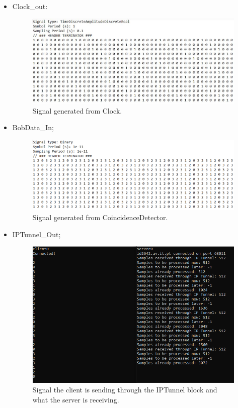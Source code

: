 \begin{refsection}
\begin{itemize}
	
	\item Clock\_out:
	\begin{figure}[H]
		\centering
		\includegraphics[width=1.1\linewidth]{./sdf/arduino_quantum_rx/figures/Clock.JPG}
		\caption{Signal generated from Clock.}
		\label{fig:arduino}
	\end{figure}
	\clearpage
	
	\item BobData\_In;
	\begin{figure}[H]
		\centering
		\includegraphics[width=1.1\linewidth]{./sdf/arduino_quantum_rx/figures/Bobdatain.PNG}
		\caption{Signal generated from CoincidenceDetector.}
		\label{fig:arduino}
	\end{figure}

		\item IPTunnel\_Out;
	\begin{figure}[H]
		\centering
		\includegraphics[width=1\linewidth]{./sdf/arduino_quantum_rx/figures/Iptunnel.PNG}
		\caption{Signal the client is sending through the IPTunnel block and what the server is receiving.}
		\label{fig:arduino}
	\end{figure}


\end{itemize}
\end{refsection}

